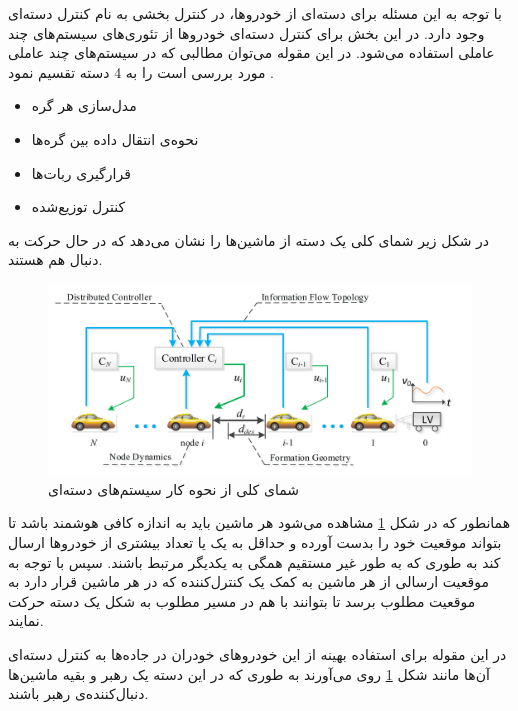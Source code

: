 با توجه به این مسئله برای دسته‌ای از خودروها، در کنترل بخشی به نام کنترل دسته‌ای وجود دارد. در این بخش برای کنترل دسته‌ای خودروها از تئوری‌های سیستم‌های چند عاملی استفاده می‌شود. در این مقوله می‌توان مطالبی که در سیستم‌های چند عاملی مورد بررسی است را به 4 دسته تقسیم نمود \cite{li2017platoon}.
\begin{itemize}
	\item ‌مدل‌سازی هر گره
	\item نحوه‌ی انتقال داده‌ بین گره‌ها
	\item قرارگیری ربات‌ها
	\item کنترل توزیع‌شده
\end{itemize}

در شکل زیر شمای کلی یک دسته از ماشین‌ها را نشان می‌دهد که در حال حرکت به دنبال هم هستند.

\begin{figure}[!h] 
	\centering
	\includegraphics[scale=0.2]{Images/intro-platoon.png}
	\caption{شمای کلی از نحوه کار سیستم‌های دسته‌ای}\label{Fig intro platoon}
\end{figure}

همانطور که در شکل \ref{Fig intro platoon} مشاهده می‌شود هر ماشین باید به اندازه کافی هوشمند باشد تا بتواند موقعیت خود را بدست آورده و حداقل به یک یا تعداد بیشتری از خودروها ارسال کند به طوری که به طور غیر مستقیم همگی به یکدیگر مرتبط باشند. سپس با توجه به موقعیت ارسالی از هر ماشین به کمک یک کنترل‌کننده که در هر ماشین قرار دارد به موقعیت مطلوب برسد تا بتوانند با هم در مسیر مطلوب به شکل یک دسته حرکت نمایند.

در این مقوله برای استفاده بهینه از این خودروهای خودران در جاده‌ها به کنترل دسته‌ای آن‌ها مانند شکل \ref{Fig intro platoon} روی می‌آورند به طوری که در این دسته یک رهبر و بقیه ماشین‌ها دنبال‌کننده‌ی رهبر باشند.


